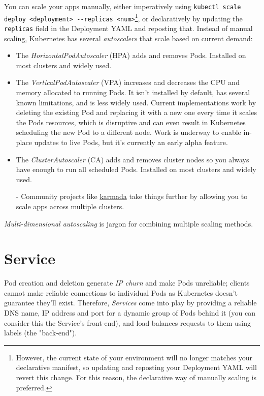 \documentclass[8pt, table, xcdraw]{article}%
\begin{document}
You can scale your apps manually, either imperatively using \lstinline{kubectl scale deploy <deployment> --replicas <num>}\footnote{However, the current state of your environment will no longer matches your declarative manifest, so updating and reposting your Deployment YAML will revert this change. For this reason, the declarative way of manually scaling is preferred.}, or declaratively by updating the \lstinline{replicas} field in the Deployment YAML and reposting that. Instead of manual scaling, Kubernetes has several \emph{autoscalers} that scale based on current demand:

\begin{itemize}
    \item The \emph{HorizontalPodAutoscaler} (HPA) adds and removes Pods. Installed on most clusters and widely used.
    \item The \emph{VerticalPodAutoscaler} (VPA) increases and decreases the CPU and memory allocated to running Pods. It isn’t installed by default, has several known limitations, and is less widely used. Current implementations work by deleting the existing Pod and replacing it with a new one every time it scales the Pods resources, which is disruptive and can even result in Kubernetes scheduling the new Pod to a different node. Work is underway to enable in-place updates to live Pods, but it’s
    currently an early alpha feature.
    \item The \emph{ClusterAutoscaler} (CA) adds and removes cluster nodes so you always have enough to run all scheduled Pods. Installed on most clusters and widely used.
    \item[-] Community projects like \href{https://karmada.io/}{karmada} take things further by allowing you to scale apps across multiple clusters.
\end{itemize}

\emph{Multi-dimensional autoscaling} is jargon for combining multiple scaling methods.

\section{Service}

Pod creation and deletion generate \emph{IP churn} and make Pods unreliable; clients cannot make reliable connections to individual Pods as Kubernetes doesn’t guarantee they’ll exist. Therefore, \emph{Services} come into play by providing a reliable DNS name, IP address and port for a dynamic group of Pods behind it (you can consider this the Service's front-end), and load balances requests to them using labels (the "back-end").
\end{document}
